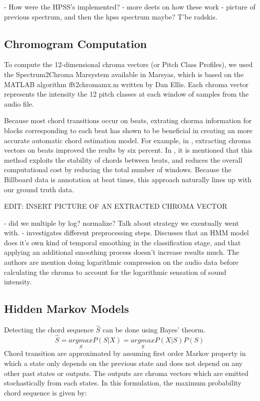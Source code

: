 \documentclass{article}
\begin{document}
- How were the HPSS's implemented?
- more deets on how these work
- picture of previous spectrum, and then the hpss spectrum maybe? T'be radskis.

\subsection{Chromogram Computation}

To compute the 12-dimensional chroma vectors (or Pitch Class Profiles), we used the 
Spectrum2Chroma Marsystem available in Marsyas, which is based on the MATLAB algorithm 
fft2chromamx.m written by Dan Ellis.
Each chroma vector represents the intensity the 12 pitch classes at each window of 
samples from the audio file. 

Because most chord transitions occur on beats, extrating chorma information for blocks corresponding
to each beat has shown to be beneficial in creating an more accurate automatic chord
estimation model. For example, in \cite{Zenz:20}, extracting chroma vectors on beats improved
the reults by six percent. In \cite{McVicor:00}, it is mentioned that this method exploits the stability
of chords between beats, and reduces the overall computational cost by reducing the total
number of windows. Because the Billboard data is annotation at beat times, this approach naturally
lines up with our ground truth data.

EDIT: INSERT PICTURE OF AN EXTRACTED CHROMA VECTOR

- did we multiple by log? normalize? Talk about strategy we exentually went with.
- \cite{Jiang:22} investigates different preprocessing steps. Discusses that
an HMM model does it's own kind of temporal smoothing in the classification
stage, and that applying an additional smoothing process doesn't increase results much.
The authors are mention doing logarithmic compression on the audio data before
calculating the chroma to account for the logarithmic sensation of sound intensity.

\subsection{Hidden Markov Models}

Detecting the chord sequence $\hat{S}$ can be done using Bayes' theorm.
$$\hat{S} = \underset{S}{argmax} P(S|X) = \underset{S}{argmax} P(X|S) P(S)$$
Chord transition are approximated by assuming first order Markov property in which a state only depends
on the previous state and does not depend on any other past states or outputs. The outputs are chroma
vectors which are emitted stochastically from each states. In this formulation, the maximum probability
chord sequence is given by:
\end{document}
